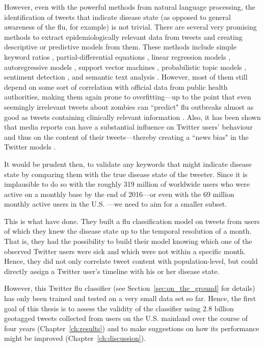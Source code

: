 \documentclass[11pt, a4paper,twoside]{report}\usepackage[]{graphicx}\usepackage[]{color}
\begin{document}
However, even with the powerful methods from natural language processing, the identification of tweets that indicate disease state (as opposed to general awareness of the flu, for example) is not trivial. There are several very promising methods to extract epidemiologically relevant data from tweets and creating descriptive or predictive models from them. These methods include simple keyword ratios \citep{lampos_tracking_2010}, partial-differential equations \citep{wang_regional_2016}, linear regression models \citep{culotta_towards_2010}, autoregressive models \citep{achrekar_predicting_2011,paul_twitter_2014,paul_worldwide_2015}, support vector machines \citep{paul_you_2011}, probabilistic topic models \citep{paul_you_2011}, sentiment detection \citep{aramaki_twitter_2011}, and semantic text analysis \citep{lamb_separating_2013}. However, most of them still depend on some sort of correlation with official data from public health authorities, making them again prone to overfitting---up to the point that even seemingly irrelevant tweets about zombies can ``predict" flu outbreaks almost as good as tweets containing clinically relevant information \citep{bodnar_validating_2013}. Also, it has been shown that media reports can have a substantial influence on Twitter users' behaviour and thus on the content of their tweets---thereby creating a ``news bias" in the Twitter models \citep{aramaki_twitter_2011}.

It would be prudent then, to validate any keywords that might indicate disease state by comparing them with the true disease state of the tweeter. Since it is implausible to do so with the roughly 319 million of worldwide users who were active on a monthly base by the end of 2016---or even with the 69 million monthly active users in the U.S. \citep{twitter_annual_2017}---we need to aim for a smaller subset.

This is what \cite{bodnar_ground_2014} have done. They built a flu classification model on tweets from users of which they knew the disease state up to the temporal resolution of a month. That is, they had the possibility to build their model knowing which one of the observed Twitter users were sick and which were not within a specific month. Hence, they did not only correlate tweet content with population-level, but could directly assign a Twitter user's timeline with his or her disease state. 

However, this Twitter flu classifier (see Section~\ref{sec:on_the_ground} for details) has only been trained and tested on a very small data set so far. Hence, the first goal of this thesis is to assess the validity of the classifier using 2.8 billion geotagged tweets collected from users on the U.S. mainland over the course of four years (Chapter~\ref{ch:results}) and to make suggestions on how its performance might be improved (Chapter~\ref{ch:discussion}).
\end{document}
